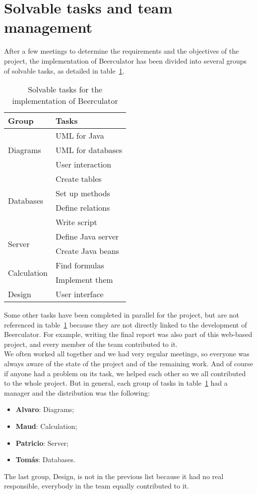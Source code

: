 \section{Solvable tasks and team management}
\label{sec:task}

After a few meetings to determine the requirements and the objectives of the project, the implementation of Beerculator has been divided into several groups of solvable tasks, as detailed in {\sc table}~\ref{table:tasks}.

\begin{table}[H]
\centering
\begin{tabular}{|l|l|}
  \hline
  \textbf{Group} & \textbf{Tasks}\\ \hline
  \multirow{3}{*}{Diagrams} & UML for Java \\
    & UML for databases \\
    & User interaction \\ \hline
  \multirow{4}{*}{Databases} & Create tables \\
    & Set up methods \\
    & Define relations \\ 
    & Write script \\ \hline
  \multirow{2}{*}{Server} & Define Java server \\
    & Create Java beans \\
 \hline
    \multirow{2}{*}{Calculation} & Find formulas \\
    & Implement them \\ \hline
    Design & User interface\\
    \hline
\end{tabular}
\caption{Solvable tasks for the implementation of Beerculator}
\label{table:tasks}
\end{table}


Some other tasks have been completed in parallel for the project, but are not referenced in {\sc table}~\ref{table:tasks} because they are not directly linked to the development of Beerculator. For example, writing the final report was also part of this web-based project, and every member of the team contributed to it.\\


We often worked all together and we had very regular meetings, so everyone was always aware of the state of the project and of the remaining work. And of course if anyone had a problem on its task, we helped each other so we all contributed to the whole project. But in general, each group of tasks in {\sc table}~\ref{table:tasks} had a \guillemotleft{} manager \guillemotright{} and the distribution was the following:

\begin{itemize}[noitemsep]
\item {\bf Alvaro}: Diagrams;
\item {\bf Maud}: Calculation;
\item {\bf Patricio}: Server;
\item {\bf Tomás}: Databases.
\end{itemize}

The last group, Design, is not in the previous list because it had no real responsible, everybody in the team equally contributed to it.